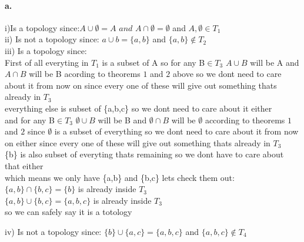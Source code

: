 \documentclass[11pt]{article}
\begin{document}
\paragraph{a.}
i)Is a topology since:$A\cup\emptyset=A$ $and$ $A\cap\emptyset=\emptyset$ and $A,\emptyset\in T_1$\\
ii) Is not a topology since: ${a}\cup{b}=\{a,b\}$ and $\{a,b\}\notin T_2$\\
iii) Is a topology since:\\
First of all everyting in $T_1$ is a subset of A so for any B$\in T_3$ $A\cup B$ will be A and $A\cap B$ will be B acording to theorems $1$ and $2$ above so we dont need to care about it from now on since every one of these will give out something thats already in $T_3$\\
everything else is subset of \{a,b,c\} so we dont need to care about it either\\
and for any B$\in T_3$ $\emptyset\cup B$ will be B and $\emptyset\cap B$ will be $\emptyset$ according to theorems $1$ and $2$ since $\emptyset$ is a subset of everything so we dont need to care about it from now on either since every one of these will give out something thats already in $T_3$\\
\{b\} is also subset of everyting thats remaining so we dont have to care about that either\\
which means we only have \{a,b\} and \{b,c\} lets check them out:\\
$\{a,b\}\cap\{b,c\}=\{b\}$ is already inside $T_3$\\
$\{a,b\}\cup\{b,c\}=\{a,b,c\}$ is already inside $T_3$\\
so we can safely say it is a totology

iv) Is not a topology since: $\{b\}\cup\{a,c\}=\{a,b,c\}$ and $\{a,b,c\}\notin T_4$\\
\end{document}

